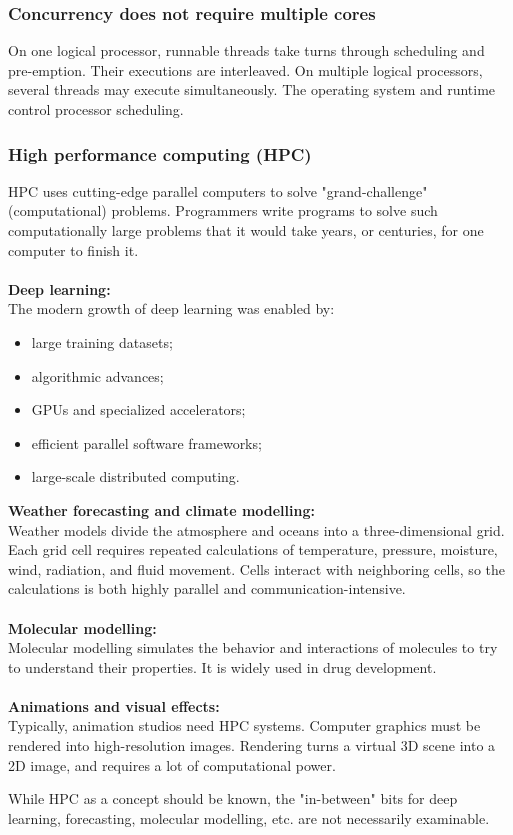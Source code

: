 \documentclass[11pt]{article}
\begin{document}
\subsubsection{Concurrency does not require multiple cores}
On one logical processor, runnable threads take turns through scheduling and pre-emption. Their executions are interleaved.
On multiple logical processors, several threads may execute simultaneously. The operating system and runtime control processor scheduling.
\subsubsection{High performance computing (HPC)}
HPC uses cutting-edge parallel computers to solve "grand-challenge" (computational) problems.
Programmers write programs to solve such computationally large problems that it would take years, or centuries, for one computer to finish it.
\\\\
\textbf{Deep learning:}\\
The modern growth of deep learning was enabled by:
\begin{itemize}
    \item large training datasets;
    \item algorithmic advances;
    \item GPUs and specialized accelerators;
    \item efficient parallel software frameworks;
    \item large-scale distributed computing.
\end{itemize}
\textbf{Weather forecasting and climate modelling:}\\
Weather models divide the atmosphere and oceans into a three-dimensional grid. Each grid cell requires repeated calculations of temperature, pressure, moisture, wind, radiation, and fluid movement.
Cells interact with neighboring cells, so the calculations is both highly parallel and communication-intensive.
\\\\
\textbf{Molecular modelling:}\\
Molecular modelling simulates the behavior and interactions of molecules to try to understand their properties.
It is widely used in drug development.
\\\\
\textbf{Animations and visual effects:}\\
Typically, animation studios need HPC systems. Computer graphics must be rendered into high-resolution images.
Rendering turns a virtual 3D scene into a 2D image, and requires a lot of computational power.
\begin{note}[Note]
While HPC as a concept should be known, the "in-between" bits for deep learning, forecasting, molecular modelling, etc. are not necessarily examinable.
\end{note}
\end{document}
